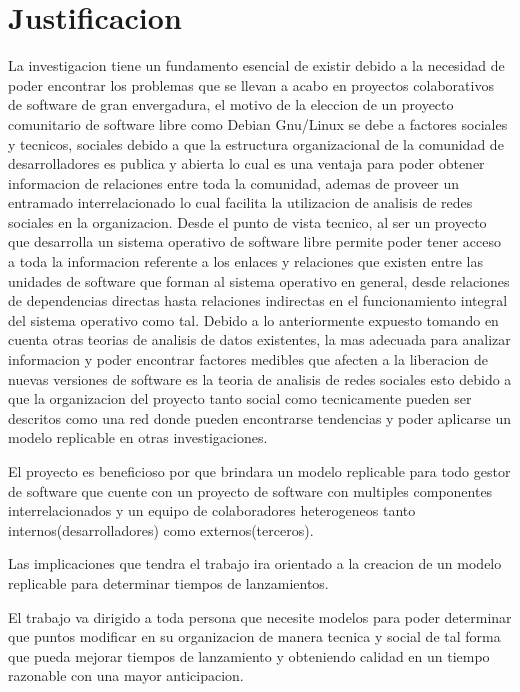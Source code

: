 \documentclass[12pt]{report}
\begin{document}
\chapter*{Justificacion}
La investigacion tiene un fundamento esencial de existir debido a la
necesidad de poder encontrar los problemas que se llevan a acabo en
proyectos colaborativos de software de gran envergadura, el motivo de
la eleccion de un proyecto comunitario de software libre como Debian
Gnu/Linux se debe a factores sociales y tecnicos, sociales debido a
que la estructura organizacional de la comunidad de desarrolladores es
publica y abierta lo cual es una ventaja para poder obtener
informacion de relaciones entre toda la comunidad, ademas de proveer
un entramado interrelacionado lo cual facilita la utilizacion de
analisis de redes sociales en la organizacion. Desde el punto de vista
tecnico, al ser un proyecto que desarrolla un sistema operativo de
software libre permite poder tener acceso a toda la informacion
referente a los enlaces y relaciones que existen entre las unidades de
software que forman al sistema operativo en general, desde relaciones
de dependencias directas hasta relaciones indirectas en el
funcionamiento integral del sistema operativo como tal. Debido a lo
anteriormente expuesto tomando en cuenta otras teorias de analisis de
datos existentes, la mas adecuada para analizar informacion y poder
encontrar factores medibles que afecten a la liberacion de nuevas
versiones de software es la teoria de analisis de redes sociales esto
debido a que la organizacion del proyecto tanto social como
tecnicamente pueden ser descritos como una red donde pueden
encontrarse tendencias y poder aplicarse un modelo replicable en otras
investigaciones.

El proyecto es beneficioso por que brindara un modelo replicable para
todo gestor de software que cuente con un proyecto de software con
multiples componentes interrelacionados y un equipo de colaboradores
heterogeneos tanto internos(desarrolladores) como externos(terceros).

Las implicaciones que tendra el trabajo ira orientado a la creacion de
un modelo replicable para determinar tiempos de lanzamientos.

El trabajo va dirigido a toda persona que necesite modelos para poder
determinar que puntos modificar en su organizacion de manera tecnica y
social de tal forma que pueda mejorar tiempos de lanzamiento y
obteniendo calidad en un tiempo razonable con una mayor anticipacion.
\end{document}
